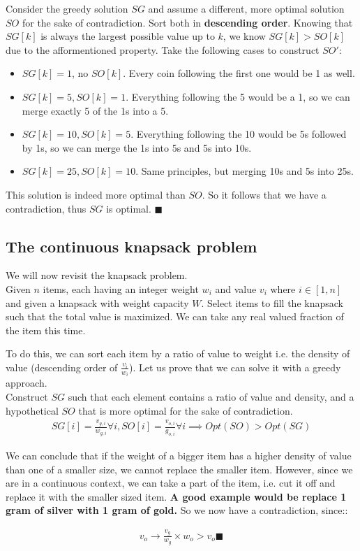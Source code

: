 \documentclass[12pt]{book}
\begin{document}
Consider the greedy solution $SG$ and assume a different, more optimal solution $SO$ for the sake of contradiction. Sort both in \textbf{descending order}. Knowing that $SG[k]$ is always the largest possible value up to $k$, we know $SG[k]>SO[k]$ due to the afformentioned property. Take the following cases to construct $SO'$:

\begin{itemize}
    \item $SG[k]=1$, no $SO[k]$. Every coin following the first one would be 1 as well.
    \item $SG[k]=5,SO[k]=1$. Everything following the 5 would be a 1, so we can merge exactly 5 of the 1s into a 5.
    \item $SG[k]=10,SO[k]=5$. Everything following the 10 would be 5s followed by 1s, so we can merge the 1s into 5s and 5s into 10s.
    \item $SG[k]=25,SO[k]=10$. Same principles, but merging 10s and 5s into 25s.
\end{itemize}

This solution is indeed more optimal than $SO$. So it follows that we have a contradiction, thus $SG$ is optimal. $\blacksquare$

\subsection*{The continuous knapsack problem}

We will now revisit the knapsack problem.\\

Given $n$ items, each having an integer weight $w_i$ and value $v_i$ where $i\in [1,n]$ and given a knapsack with weight capacity $W$. Select items to fill the knapsack such that the total value is maximized. We can take any real valued fraction of the item this time.

To do this, we can sort each item by a ratio of value to weight i.e. the density of value (descending order of $\frac{v_i}{w_i}$). Let us prove that we can solve it with a greedy approach.\\

Construct $SG$ such that each element contains a ratio of value and density, and a hypothetical $SO$ that is more optimal for the sake of contradiction.
\begin{align*}
    SG[i]=\frac{v_{g,i}}{w_{g,i}}\forall i, SO[i]=\frac{v_{o,i}}{g_{o,i}}\forall i\implies Opt(SO)>Opt(SG)
\end{align*}

We can conclude that if the weight of a bigger item has a higher density of value than one of a smaller size, we cannot replace the smaller item. However, since we are in a continuous context, we can take a part of the item, i.e. cut it off and replace it with the smaller sized item. \textbf{A good example would be replace 1 gram of silver with 1 gram of gold.} So we now have a contradiction, since::

\begin{align*}
    v_o\rightarrow \frac{v_g}{w_g}\times w_o>v_o\blacksquare
\end{align*}
\end{document}
